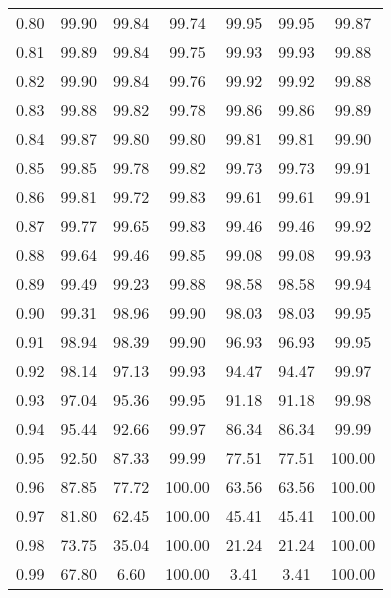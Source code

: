 \begin{tabular}{|c|c|c|c|c|c|c|}
      0.80 &     99.90 &     99.84 &      99.74 &   99.95 &      99.95 &         99.87 \\
      0.81 &     99.89 &     99.84 &      99.75 &   99.93 &      99.93 &         99.88 \\
      0.82 &     99.90 &     99.84 &      99.76 &   99.92 &      99.92 &         99.88 \\
      0.83 &     99.88 &     99.82 &      99.78 &   99.86 &      99.86 &         99.89 \\
      0.84 &     99.87 &     99.80 &      99.80 &   99.81 &      99.81 &         99.90 \\
      0.85 &     99.85 &     99.78 &      99.82 &   99.73 &      99.73 &         99.91 \\
      0.86 &     99.81 &     99.72 &      99.83 &   99.61 &      99.61 &         99.91 \\
      0.87 &     99.77 &     99.65 &      99.83 &   99.46 &      99.46 &         99.92 \\
      0.88 &     99.64 &     99.46 &      99.85 &   99.08 &      99.08 &         99.93 \\
      0.89 &     99.49 &     99.23 &      99.88 &   98.58 &      98.58 &         99.94 \\
      0.90 &     99.31 &     98.96 &      99.90 &   98.03 &      98.03 &         99.95 \\
      0.91 &     98.94 &     98.39 &      99.90 &   96.93 &      96.93 &         99.95 \\
      0.92 &     98.14 &     97.13 &      99.93 &   94.47 &      94.47 &         99.97 \\
      0.93 &     97.04 &     95.36 &      99.95 &   91.18 &      91.18 &         99.98 \\
      0.94 &     95.44 &     92.66 &      99.97 &   86.34 &      86.34 &         99.99 \\
      0.95 &     92.50 &     87.33 &      99.99 &   77.51 &      77.51 &        100.00 \\
      0.96 &     87.85 &     77.72 &     100.00 &   63.56 &      63.56 &        100.00 \\
      0.97 &     81.80 &     62.45 &     100.00 &   45.41 &      45.41 &        100.00 \\
      0.98 &     73.75 &     35.04 &     100.00 &   21.24 &      21.24 &        100.00 \\
      0.99 &     67.80 &      6.60 &     100.00 &    3.41 &       3.41 &        100.00 \\
\bottomrule
\end{tabular}

